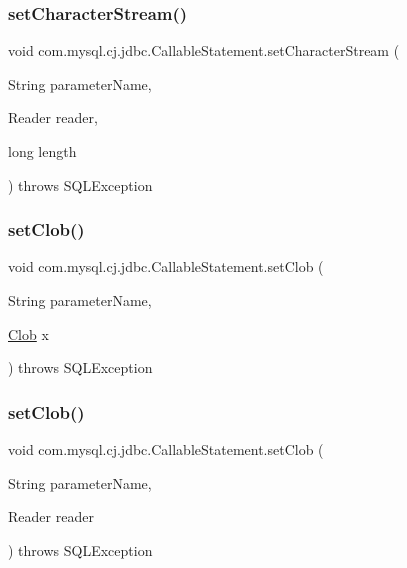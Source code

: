 \subsubsection{\texorpdfstring{set\+Character\+Stream()}{setCharacterStream()}\hspace{0.1cm}{\footnotesize\ttfamily [3/3]}}
{\footnotesize\ttfamily void com.\+mysql.\+cj.\+jdbc.\+Callable\+Statement.\+set\+Character\+Stream (\begin{DoxyParamCaption}\item[{String}]{parameter\+Name,  }\item[{Reader}]{reader,  }\item[{long}]{length }\end{DoxyParamCaption}) throws S\+Q\+L\+Exception}

\mbox{\label{classcom_1_1mysql_1_1cj_1_1jdbc_1_1_callable_statement_a7f54a9f87ebdf219de9940389d32f3d1}} 
\subsubsection{\texorpdfstring{set\+Clob()}{setClob()}\hspace{0.1cm}{\footnotesize\ttfamily [1/3]}}
{\footnotesize\ttfamily void com.\+mysql.\+cj.\+jdbc.\+Callable\+Statement.\+set\+Clob (\begin{DoxyParamCaption}\item[{String}]{parameter\+Name,  }\item[{\mbox{\hyperlink{classcom_1_1mysql_1_1cj_1_1jdbc_1_1_clob}{Clob}}}]{x }\end{DoxyParamCaption}) throws S\+Q\+L\+Exception}

\mbox{\label{classcom_1_1mysql_1_1cj_1_1jdbc_1_1_callable_statement_a4e6b7cc4dbd931dcb5bb35e40930ef23}} 
\subsubsection{\texorpdfstring{set\+Clob()}{setClob()}\hspace{0.1cm}{\footnotesize\ttfamily [2/3]}}
{\footnotesize\ttfamily void com.\+mysql.\+cj.\+jdbc.\+Callable\+Statement.\+set\+Clob (\begin{DoxyParamCaption}\item[{String}]{parameter\+Name,  }\item[{Reader}]{reader }\end{DoxyParamCaption}) throws S\+Q\+L\+Exception}

